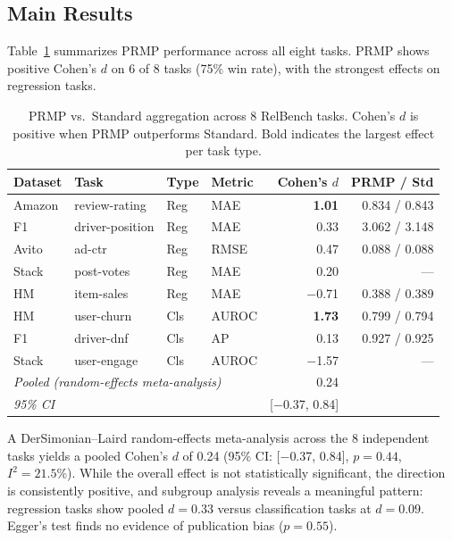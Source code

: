\documentclass[11pt,letterpaper]{article}
\begin{document}
\subsection{Main Results}

Table~\ref{tab:main_results} summarizes PRMP performance across all eight tasks. PRMP shows positive Cohen's $d$ on 6 of 8 tasks (75\% win rate), with the strongest effects on regression tasks.

\begin{table}[!htbp]
\centering
\caption{PRMP vs.\ Standard aggregation across 8 RelBench tasks. Cohen's $d$ is positive when PRMP outperforms Standard. Bold indicates the largest effect per task type.}
\label{tab:main_results}
\small
\begin{tabular}{llllrr}
\toprule
Dataset & Task & Type & Metric & Cohen's $d$ & PRMP / Std \\
\midrule
Amazon & review-rating & Reg & MAE & \textbf{1.01} & 0.834 / 0.843 \\
F1 & driver-position & Reg & MAE & 0.33 & 3.062 / 3.148 \\
Avito & ad-ctr & Reg & RMSE & 0.47 & 0.088 / 0.088 \\
Stack & post-votes & Reg & MAE & 0.20 & --- \\
HM & item-sales & Reg & MAE & $-$0.71 & 0.388 / 0.389 \\
\midrule
HM & user-churn & Cls & AUROC & \textbf{1.73} & 0.799 / 0.794 \\
F1 & driver-dnf & Cls & AP & 0.13 & 0.927 / 0.925 \\
Stack & user-engage & Cls & AUROC & $-$1.57 & --- \\
\midrule
\multicolumn{4}{l}{\textit{Pooled (random-effects meta-analysis)}} & 0.24 & \\
\multicolumn{4}{l}{\textit{95\% CI}} & [$-$0.37, 0.84] & \\
\bottomrule
\end{tabular}
\end{table}

A DerSimonian--Laird random-effects meta-analysis across the 8 independent tasks yields a pooled Cohen's $d$ of 0.24 (95\% CI: [$-$0.37, 0.84], $p = 0.44$, $I^2 = 21.5\%$). While the overall effect is not statistically significant, the direction is consistently positive, and subgroup analysis reveals a meaningful pattern: regression tasks show pooled $d = 0.33$ versus classification tasks at $d = 0.09$. Egger's test finds no evidence of publication bias ($p = 0.55$).
\end{document}
